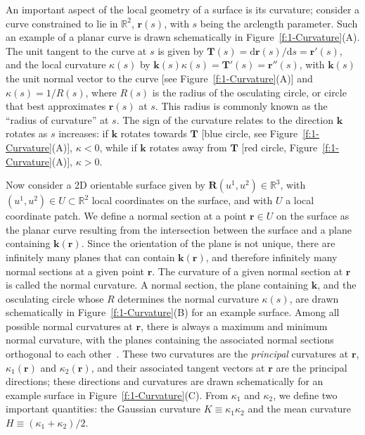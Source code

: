 An important aspect of the local geometry of a surface is its curvature; consider a curve constrained to lie in $\mathbb{R}^2$, $\mathbf{r}(s)$, with $s$ being the arclength parameter.
Such an example of a planar curve is drawn schematically in Figure~\ref{f:1-Curvature}(A).
The unit tangent to the curve at $s$ is given by $\mathbf{T}(s) = \textrm{d} \mathbf{r}(s)/\textrm{d}s = \mathbf{r}'(s)$, and the local curvature $\kappa(s)$ by $\mathbf{k}(s)\kappa(s) = \mathbf{T}'(s) = \mathbf{r}''(s) $, with $\mathbf{k}(s)$ the unit normal vector to the curve [see Figure~\ref{f:1-Curvature}(A)] and $\kappa(s) = 1/R(s)$, where $R(s)$ is the radius of the osculating circle, or circle that best approximates $\mathbf{r}(s)$ at $s$.
This radius is commonly known as the ``radius of curvature'' at $s$.
The sign of the curvature relates to the direction $\mathbf{k}$ rotates as $s$ increases: if $\mathbf{k}$ rotates towards $\mathbf{T}$ [blue circle, see Figure~\ref{f:1-Curvature}(A)], $\kappa < 0$, while if $\mathbf{k}$ rotates away from $\mathbf{T}$ [red circle, Figure~\ref{f:1-Curvature}(A)], $\kappa > 0$.

Now consider a 2D orientable surface given by $\mathbf{R}(u^1,u^2) \in \mathbb{R}^3$, with $(u^1,u^2) \in U \subset \mathbb{R}^2$ local coordinates on the surface, and with $U$ a local coordinate patch.
We define a normal section at a point $\mathbf{r} \in U$ on the surface as the planar curve resulting from the intersection between the surface and a plane containing $\mathbf{k}(\mathbf{r})$.
Since the orientation of the plane is not unique, there are infinitely many planes that can contain $\mathbf{k}(\mathbf{r})$, and therefore infinitely many normal sections at a given point $\mathbf{r}$.
The curvature of a given normal section at $\mathbf{r}$ is called the normal curvature.
A normal section, the plane containing $\mathbf{k}$, and the osculating circle whose $R$ determines the normal curvature $\kappa(s)$, are drawn schematically in Figure~\ref{f:1-Curvature}(B) for an example surface.
Among all possible normal curvatures at $\mathbf{r}$, there is always a maximum and minimum normal curvature, with the planes containing the associated normal sections orthogonal to each other~\cite{RN35}.
These two curvatures are the \textit{principal} curvatures at $\mathbf{r}$, $\kappa_1 (\mathbf{r})$ and $\kappa_2(\mathbf{r})$, and their associated tangent vectors at $\mathbf{r}$ are the principal directions; these directions and curvatures are drawn schematically for an example surface in Figure~\ref{f:1-Curvature}(C).
From $\kappa_1$ and $\kappa_2$, we define two important quantities: the Gaussian curvature $K  \equiv \kappa_1 \kappa_2$ and the mean curvature $H \equiv  (\kappa_1+\kappa_2)/2$.

